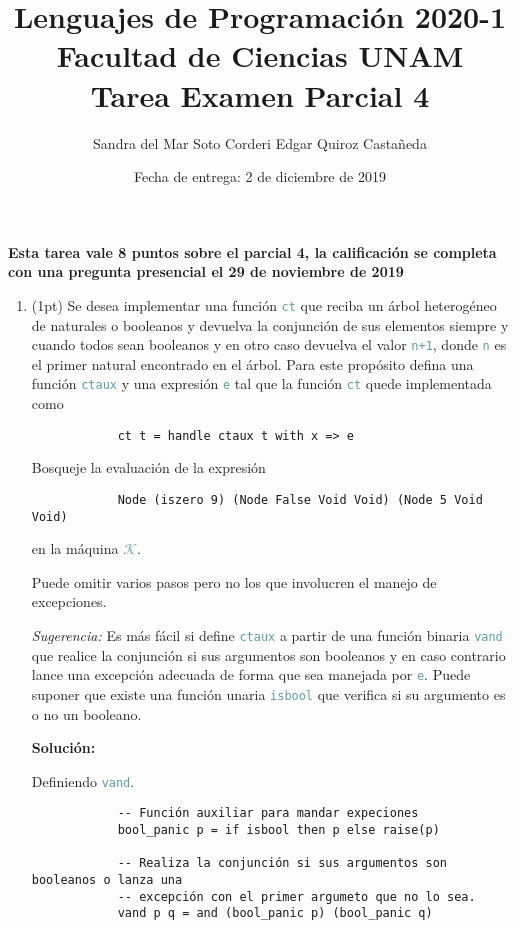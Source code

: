 \documentclass{article}
\title {
    \color{RoyalPurple}
    Lenguajes de Programación 2020-1\\
    Facultad de Ciencias UNAM\\
    Tarea Examen Parcial 4
}
\author{
    Sandra del Mar Soto Corderi \quad Edgar Quiroz Castañeda
}
\date{
    Fecha de entrega: 2 de diciembre de 2019
}
\newcommand{\tx}[1]{\textcolor{CadetBlue} {\texttt{#1}}}
\newcommand{\tb}[1]{\textcolor{RoyalPurple} {\textbf{#1}}}
\newcommand{\ti}[1]{\textcolor{RoyalPurple} {\textit{#1}}}
\newcommand{\pt}[1]{\textcolor{RoyalPurple}{(#1pt)}}
\begin{document}
    \maketitle

    \tb{Esta tarea vale 8 puntos sobre el parcial 4, la calificación se 
    completa con una pregunta presencial el 29 de noviembre de 2019}

    \begin{enumerate}
        \item \pt{1} Se desea implementar una función \tx{ct} que reciba un 
        árbol heterogéneo de naturales o booleanos y devuelva la conjunción de 
        sus elementos siempre y cuando todos sean booleanos y en otro caso 
        devuelva el valor \tx{n+1}, donde \tx{n} es el primer natural encontrado en el
        árbol. Para este propósito defina una función \tx{ctaux} y una expresión
        \tx{e} tal que la función \tx{ct} quede implementada como
        
        \begin{verbatim}
            ct t = handle ctaux t with x => e
        \end{verbatim}

        Bosqueje la evaluación de la expresión

        \begin{verbatim}
            Node (iszero 9) (Node False Void Void) (Node 5 Void Void)
        \end{verbatim}

        en la máquina \tx{$\mathcal{K}$}.

        Puede omitir varios pasos pero no los que involucren el manejo de 
        excepciones.

        \ti{Sugerencia:} Es más fácil si define \tx{ctaux} a partir de una
        función binaria \tx{vand} que realice la conjunción si sus argumentos
        son booleanos y en caso contrario lance una excepción adecuada de forma
        que sea manejada por \tx{e}. Puede suponer que existe una función unaria 
        \tx{isbool} que verifica si su argumento es o no un booleano.

        \tb{Solución:}

        Definiendo \tx{vand}.

        \begin{verbatim}
            -- Función auxiliar para mandar expeciones
            bool_panic p = if isbool then p else raise(p)

            -- Realiza la conjunción si sus argumentos son booleanos o lanza una
            -- excepción con el primer argumeto que no lo sea.
            vand p q = and (bool_panic p) (bool_panic q)
        \end{verbatim}


\end{enumerate}
\end{document}
